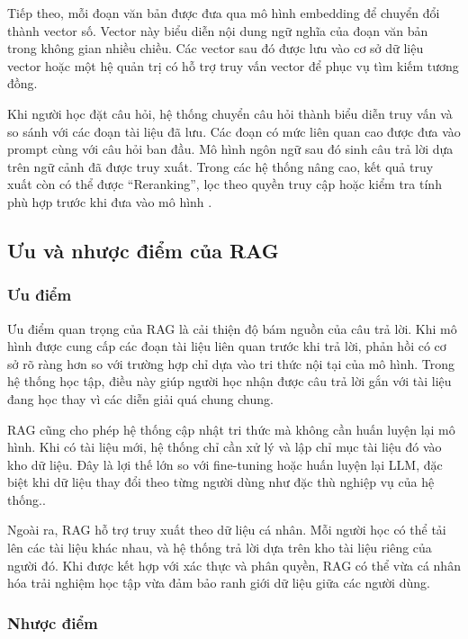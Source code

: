 \documentclass[12pt,a4paper]{report}
\begin{document}
Tiếp theo, mỗi đoạn văn bản được đưa qua mô hình embedding để chuyển đổi thành vector số. Vector này biểu diễn nội dung ngữ nghĩa của đoạn văn bản trong không gian nhiều chiều. Các vector sau đó được lưu vào cơ sở dữ liệu vector hoặc một hệ quản trị có hỗ trợ truy vấn vector để phục vụ tìm kiếm tương đồng.

Khi người học đặt câu hỏi, hệ thống chuyển câu hỏi thành biểu diễn truy vấn và so sánh với các đoạn tài liệu đã lưu. Các đoạn có mức liên quan cao được đưa vào prompt cùng với câu hỏi ban đầu. Mô hình ngôn ngữ sau đó sinh câu trả lời dựa trên ngữ cảnh đã được truy xuất. Trong các hệ thống nâng cao, kết quả truy xuất còn có thể được ``Reranking'', lọc theo quyền truy cập hoặc kiểm tra tính phù hợp trước khi đưa vào mô hình \cite{gao2023ragSurvey}.

\subsection{Ưu và nhược điểm của RAG}

\subsubsection{Ưu điểm}

Ưu điểm quan trọng của RAG là cải thiện độ bám nguồn của câu trả lời. Khi mô hình được cung cấp các đoạn tài liệu liên quan trước khi trả lời, phản hồi có cơ sở rõ ràng hơn so với trường hợp chỉ dựa vào tri thức nội tại của mô hình. Trong hệ thống học tập, điều này giúp người học nhận được câu trả lời gắn với tài liệu đang học thay vì các diễn giải quá chung chung.

RAG cũng cho phép hệ thống cập nhật tri thức mà không cần huấn luyện lại mô hình. Khi có tài liệu mới, hệ thống chỉ cần xử lý và lập chỉ mục tài liệu đó vào kho dữ liệu. Đây là lợi thế lớn so với fine-tuning hoặc huấn luyện lại LLM, đặc biệt khi dữ liệu thay đổi theo từng người dùng như đặc thù nghiệp vụ của hệ thống..

Ngoài ra, RAG hỗ trợ truy xuất theo dữ liệu cá nhân. Mỗi người học có thể tải lên các tài liệu khác nhau, và hệ thống trả lời dựa trên kho tài liệu riêng của người đó. Khi được kết hợp với xác thực và phân quyền, RAG có thể vừa cá nhân hóa trải nghiệm học tập vừa đảm bảo ranh giới dữ liệu giữa các người dùng.

\subsubsection{Nhược điểm}
\end{document}
